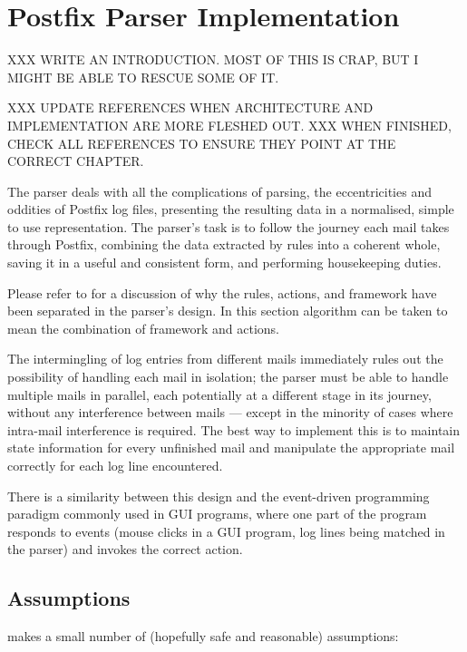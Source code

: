 \chapter{Postfix Parser Implementation}

\label{Postfix Parser Implementation}

XXX WRITE AN INTRODUCTION\@.  MOST OF THIS IS CRAP, BUT I MIGHT BE ABLE TO
RESCUE SOME OF IT\@.

XXX UPDATE REFERENCES WHEN ARCHITECTURE AND IMPLEMENTATION ARE MORE FLESHED
OUT\@.  XXX WHEN FINISHED, CHECK ALL REFERENCES TO ENSURE THEY POINT AT THE
CORRECT CHAPTER\@.

The parser deals with all the complications of parsing, the eccentricities
and oddities of Postfix log files, presenting the resulting data in a
normalised, simple to use representation.  The parser's task is to follow
the journey each mail takes through Postfix, combining the data extracted
by rules into a coherent whole, saving it in a useful and consistent form,
and performing housekeeping duties.

Please refer to  for a discussion of why the
rules, actions, and framework have been separated in the parser's design.
In this section algorithm can be taken to mean the combination of framework
and actions.

The intermingling of log entries from different mails immediately rules out
the possibility of handling each mail in isolation; the parser must be able
to handle multiple mails in parallel, each potentially at a different stage
in its journey, without any interference between mails --- except in the
minority of cases where intra-mail interference is required.  The best way
to implement this is to maintain state information for every unfinished
mail and manipulate the appropriate mail correctly for each log line
encountered.

There is a similarity between this design and the event-driven programming
paradigm commonly used in GUI programs, where one part of the program
responds to events (mouse clicks in a GUI program, log lines being matched
in the parser) and invokes the correct action.


\section{Assumptions}

\parsername{} makes a small number of (hopefully safe and reasonable)
assumptions:

